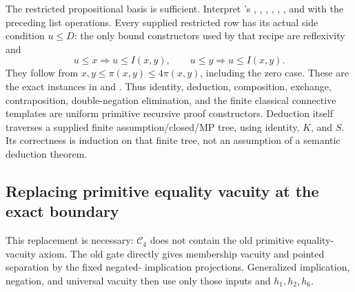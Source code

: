 The restricted propositional basis is sufficient.  Interpret
's
, , ,
, , , and 
with the preceding list operations.  Every supplied restricted row
has its actual side condition $u\le D$: the only bound constructors
used by that recipe are reflexivity and
\[
 u\le x\Longrightarrow u\le I(x,y),\qquad
 u\le y\Longrightarrow u\le I(x,y).
\]
They follow from $x,y\le\pi(x,y)\le4\pi(x,y)$, including the
zero case.  These are the exact instances in
 and
.
Thus identity, deduction, composition, exchange, contraposition,
double-negation elimination, and the finite classical connective
templates are uniform primitive recursive proof constructors.
Deduction itself traverses a supplied finite assumption/closed/MP
tree, using identity, $K$, and $S$.  Its correctness is induction on
that finite tree, not an assumption of a semantic deduction theorem.

\subsection{Replacing primitive equality vacuity at the exact boundary}

This replacement is necessary: $\mathcal C_4$ does not contain the old
primitive equality-vacuity axiom.  The old gate directly gives
membership vacuity and pointed separation by the fixed negated-
implication projections.  Generalized implication, negation, and
universal vacuity then use only those inputs and $h_1,h_2,h_6$.

